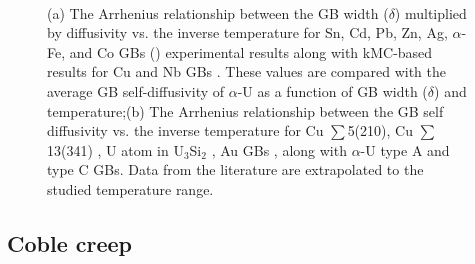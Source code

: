 \documentclass[review]{elsarticle}
\begin{document}
\begin{figure}[h!]
\centering
{}
\\
\caption{(a) The Arrhenius relationship between the GB width ($\delta$) multiplied by diffusivity vs. the inverse temperature for Sn, Cd, Pb, Zn, Ag, $\alpha$-Fe, and Co GBs (\cite{diffusion_compare}) experimental results along with kMC-based results for Cu and Nb GBs \cite{cu_nb}. These values are compared with the average GB self-diffusivity of $\alpha$-U as a function of GB width ($\delta$) and temperature;(b) The Arrhenius relationship between the GB self diffusivity vs. the inverse temperature for Cu $\sum$5(210), Cu $\sum$13(341) \cite{Suzuki2003}, U atom in U$_\mathrm{3}$Si$_\mathrm{2}$ \cite{COOPER2021153129}, Au GBs \cite{diffusion_compare}, along with $\alpha$-U type A and type C GBs. Data from the literature are extrapolated to the studied temperature range.}
\label{fig:diff_comp}
\end{figure}


\subsection{Coble creep}
\end{document}
